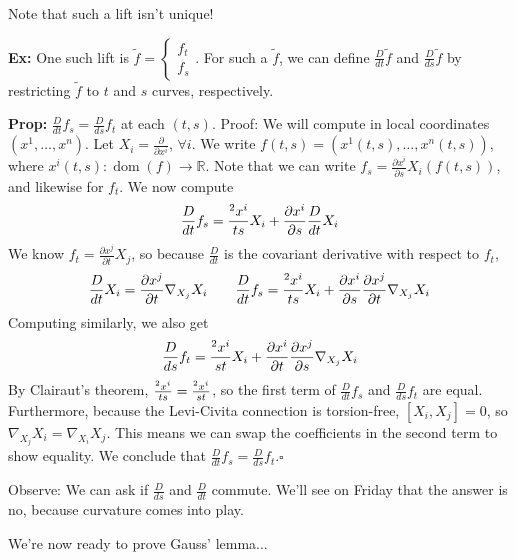 \documentclass[10pt,letterpaper]{article}
\newcommand{\n}{\hfill\break}
\newcommand{\nn}{\vspace{0.5\baselineskip}\n}
\newcommand{\hangblock}[2]{\par\noindent\settowidth{\hangindent}{\textbf{#1: }}\textbf{#1: }\nolinebreak#2}
\newcommand{\prop}[1]{\hangblock{Prop}{#1}}
\newcommand{\ex}[1]{\hangblock{Ex}{#1}}
\newcommand{\proven}{\;$\square$\n}
\newcommand{\reals}{\mathbb{R}}
\newcommand{\R}{\reals}
\let\d\relax
\newcommand{\d}{\partial}
\newcommand{\comm}[1]{\left[#1\right]}
\newcommand{\pd}[2]{\frac{\partial{}#1}{\partial{}#2}}
\DeclareMathOperator{\dom}{dom}
\begin{document}
\par\noindent
Note that such a lift isn't unique!\n

\ex{
	One such lift is $\displaystyle\tilde{f}=\left\{\begin{array}{l}f_{t}\\ f_{s}\end{array}\right.$. For such a $\tilde{f}$, we can define $\frac{D}{dt}\tilde{f}$ and $\frac{D}{ds}\tilde{f}$ by restricting $\tilde{f}$ to $t$ and $s$ curves, respectively.\n
}

\prop{
	$\frac{D}{dt}f_{s}=\frac{D}{ds}f_{t}$ at each $(t,s)$.\nn
	Proof: We will compute in local coordinates $(x^{1},\ldots,x^{n})$. Let $X_{i}=\pd{}{x^{i}}$, $\forall{}i$. We write $f(t,s)=(x^{1}(t,s),\ldots,x^{n}(t,s))$, where $x^{i}(t,s):\dom(f)\to\R$. Note that we can write $f_{s}=\pd{x^{i}}{s}X_{i}(f(t,s))$, and likewise for $f_{t}$. We now compute
	\[
		\frac{D}{dt}f_{s}=\frac{\d^{2}x^{i}}{\d{}t\d{}s}X_{i}+\pd{x^{i}}{s}\frac{D}{dt}X_{i}
	\]
	We know $f_{t}=\pd{x^{j}}{t}X_{j}$, so because $\frac{D}{dt}$ is the covariant derivative with respect to $f_{t}$,
	\[
		\frac{D}{dt}X_{i}=\pd{x^{j}}{t}\nabla_{X_{j}}X_{i}\qquad\frac{D}{dt}f_{s}=\frac{\d^{2}x^{i}}{\d{}t\d{}s}X_{i}+\pd{x^{i}}{s}\pd{x^{j}}{t}\nabla_{X_{j}}X_{i}
	\]
	Computing similarly, we also get
	\[
		\frac{D}{ds}f_{t}=\frac{\d^{2}x^{i}}{\d{}s\d{}t}X_{i}+\pd{x^{i}}{t}\pd{x^{j}}{s}\nabla_{X_{j}}X_{i}
	\]
	By Clairaut's theorem, $\frac{\d^{2}x^{i}}{\d{}t\d{}s}=\frac{\d^{2}x^{i}}{\d{}s\d{}t}$, so the first term of $\frac{D}{dt}f_{s}$ and $\frac{D}{ds}f_{t}$ are equal. Furthermore, because the Levi-Civita connection is torsion-free, $\comm{X_{i},X_{j}}=0$, so $\nabla_{X_{j}}X_{i}=\nabla_{X_{i}}X_{j}$. This means we can swap the coefficients in the second term to show equality. We conclude that $\frac{D}{dt}f_{s}=\frac{D}{ds}f_{t}$.\proven
}

\par\noindent
Observe: We can ask if $\frac{D}{ds}$ and $\frac{D}{dt}$ commute. We'll see on Friday that the answer is no, because curvature comes into play.\n

\par\noindent
We're now ready to prove Gauss' lemma...\newpage
\end{document}
